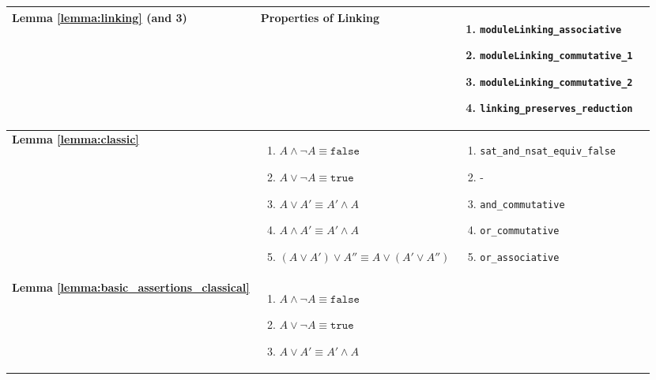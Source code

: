 \begin{table}
  \begin{tabular}{|l|l|l|l|}
    \hline

\textbf{Lemma \ref{lemma:linking} (and 3)} &
Properties of Linking
        & 
\parbox{.35\textwidth}{\scriptsize\begin{enumerate}[label={(\arabic*)}]
            \item \texttt{moduleLinking\_associative}
            \item \texttt{moduleLinking\_commutative\_1}
            \item \texttt{moduleLinking\_commutative\_2}
            \item \texttt{linking\_preserves\_reduction}
        \end{enumerate}}
        \\
\hline
\textbf{Lemma \ref{lemma:classic}} &   
\parbox{.35\textwidth}{\scriptsize\begin{enumerate}[label={(\arabic*)}]
            \item $A \wedge \neg A \equiv \texttt{false}$
            \item $A \vee \neg A \equiv \texttt{true}$
            \item $A \vee A' \equiv A' \wedge A$
            \item $A \wedge A' \equiv A' \wedge A$
            \item $(A \vee A') \vee A'' \equiv A \vee (A' \vee A'')$
        \end{enumerate}}
        & 
\parbox{.35\textwidth}{\scriptsize\begin{enumerate}[label={(\arabic*)}]
            \item \texttt{sat\_and\_nsat\_equiv\_false}
            \item -
            \item \texttt{and\_commutative}
            \item \texttt{or\_commutative}
            \item \texttt{or\_associative}
        \end{enumerate}}
        \\
\hline
\textbf{Lemma \ref{lemma:basic_assertions_classical}} &   
\parbox{.35\textwidth}{\scriptsize\begin{enumerate}[label={(\arabic*)}]
            \item $A \wedge \neg A \equiv \texttt{false}$
            \item $A \vee \neg A \equiv \texttt{true}$
            \item $A \vee A' \equiv A' \wedge A$

\end{enumerate}}
\end{tabular}
\end{table}
